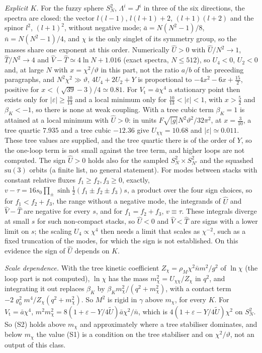\emph{Explicit \(K\).} For the fuzzy sphere \(S^2_N\), \(\Lambda^i=J^i\) in three of the six directions, the spectra are closed: the vector \(l(l-1)\), \(l(l+1)+2\), \((l+1)(l+2)\) and the spinor \(l^2\), \((l+1)^2\), without negative mode; \(\bar a=N(N^2-1)/8\), \(\bar n=N(N^2-1)/4\), and \(\chi\) is the only singlet of its symmetry group, so the masses share one exponent at this order. Numerically \(\hat U>0\) with \(\hat U/N^2\to1\), \(\hat T/N^2\to4\) and \(\hat V-\hat T\simeq4\ln N+1.016\) (exact spectra, \(N\le512\)), so \(U_4<0\), \(U_2<0\) and, at large \(N\) with \(x=\chi^2/\vartheta\) in this part, not the ratio \(a/b\) of the preceding paragraphs, and \(N^2\chi^2\gg\vartheta\), \(4U_4+2U_2+Y\) is proportional to \(-4x^2-6x+\tfrac{15}2\), positive for \(x<(\sqrt{39}-3)/4\simeq0.81\). For \(V_{\mathrm t}=\bar a\chi^4\) a stationary point then exists only for \(|\varepsilon|\ge\tfrac{10}{13}\) and a local minimum only for \(\tfrac{10}{13}<|\varepsilon|<1\), with \(x>\tfrac52\) and \(\beta_K<-1\), so there is none at weak coupling. With a tree cubic term \(\beta_K=1\) is attained at a local minimum with \(\hat U>0\): in units \(F\sqrt{|g|}N^2\vartheta^2/32\pi^2\), at \(x=\tfrac3{10}\), a tree quartic \(7.935\) and a tree cubic \(-12.36\) give \(U_{\chi\chi}=10.68\) and \(|\varepsilon|\simeq0.011\). These tree values are supplied, and the tree quartic there is of the order of \(Y\), so the one-loop term is not small against the tree term, and higher loops are not computed. The sign \(\hat U>0\) holds also for the sampled \(S^2_N\times S^2_{N'}\) and the squashed \(\mathrm{su}(3)\) orbits (a finite list, no general statement). For modes between stacks with constant relative fluxes \(f_1\ge f_2,f_3\ge0\), exactly, \(v-\tau=16s_0\prod_\pm\sinh\tfrac12(f_1\pm f_2\pm f_3)s\), a product over the four sign choices, so for \(f_1<f_2+f_3\), the range without a negative mode, the integrands of \(\hat U\) and \(\hat V-\hat T\) are negative for every \(s\), and for \(f_1=f_2+f_3\), \(v\equiv\tau\). These integrals diverge at small \(s\) for such non-compact stacks, so \(\hat U<0\) and \(\hat V<\hat T\) are signs with a lower limit on \(s\); the scaling \(U_4\propto\chi^4\) then needs a limit that scales as \(\chi^{-2}\), such as a fixed truncation of the modes, for which the sign is not established. On this evidence the sign of \(\hat U\) depends on \(K\).

\emph{Scale dependence.} With the tree kinetic coefficient \(Z_\chi=\rho_M\chi^2\bar nm^2/g^2\) of \(\ln\chi\) (the loop part is not computed), \(\ln\chi\) has the mass \(m_\chi^2=U_{\chi\chi}/Z_\chi\) in \(q^2\), and integrating it out replaces \(\beta_K\) by \(\beta_Km_\chi^2/(q^2+m_\chi^2)\), with a contact term \(-2\varrho_0^2m^4/Z_\chi(q^2+m_\chi^2)\). So \(M^2\) is rigid in \(\gamma\) above \(m_\chi\), for every \(K\). For \(V_{\mathrm t}=\bar a\chi^4\), \(m^2m_\chi^2=8(1+\varepsilon-Y/4\tilde U)\bar a\chi^2/\bar n\), which is \(4(1+\varepsilon-Y/4\tilde U)\chi^2\) on \(S^2_N\). So (S2) holds above \(m_\chi\) and approximately where a tree stabiliser dominates, and below \(m_\chi\) the value (S1) is a condition on the tree stabiliser and on \(\chi^2/\vartheta\), not an output of this class.

